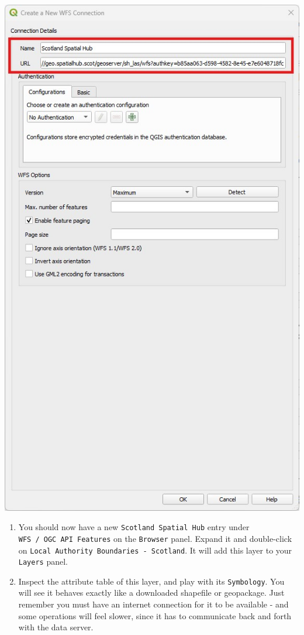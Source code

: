 \documentclass[
  letterpaper,
  DIV=11,
  numbers=noendperiod]{scrreprt}
\begin{document}
\includegraphics{images/lab_11/lab_11_fig_2_WFS_config.jpg}

\begin{enumerate}
\def\labelenumi{(\arabic{enumi})}
\setcounter{enumi}{304}
\item
  You should now have a new \texttt{Scotland\ Spatial\ Hub} entry under
  \texttt{WFS\ /\ OGC\ API\ Features} on the \texttt{Browser} panel.
  Expand it and double-click on
  \texttt{Local\ Authority\ Boundaries\ -\ Scotland}. It will add this
  layer to your \texttt{Layers} panel.
\item
  Inspect the attribute table of this layer, and play with its
  \texttt{Symbology}. You will see it behaves exactly like a downloaded
  shapefile or geopackage. Just remember you must have an internet
  connection for it to be available - and some operations will feel
  slower, since it has to communicate back and forth with the data
  server.
\end{enumerate}
\end{document}

